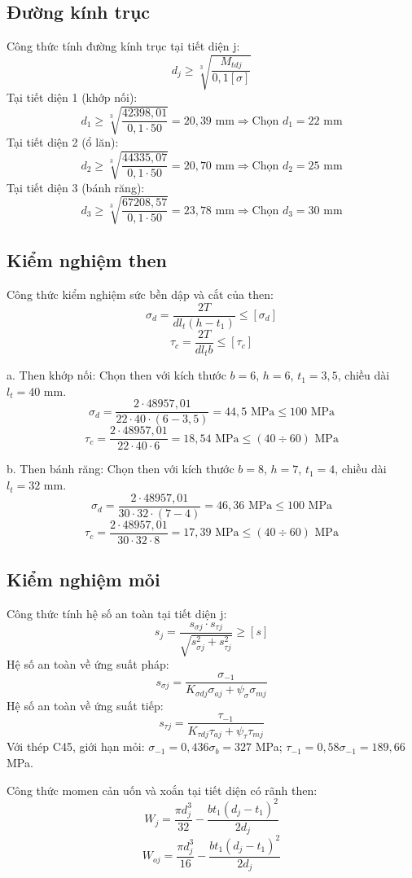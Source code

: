 \documentclass[12pt,a4paper]{report}
\begin{document}
\subsection{Đường kính trục}
Công thức tính đường kính trục tại tiết diện j:
$$d_j \geq \sqrt[3]{\frac{M_{tdj}}{0{,}1[\sigma]}}$$
Tại tiết diện 1 (khớp nối):
$$d_1 \geq \sqrt[3]{\frac{42398{,}01}{0{,}1 \cdot 50}} = 20{,}39 \text{ mm} \Rightarrow \text{Chọn } d_1 = 22 \text{ mm}$$
Tại tiết diện 2 (ổ lăn):
$$d_2 \geq \sqrt[3]{\frac{44335{,}07}{0{,}1 \cdot 50}} = 20{,}70 \text{ mm} \Rightarrow \text{Chọn } d_2 = 25 \text{ mm}$$
Tại tiết diện 3 (bánh răng):
$$d_3 \geq \sqrt[3]{\frac{67208{,}57}{0{,}1 \cdot 50}} = 23{,}78 \text{ mm} \Rightarrow \text{Chọn } d_3 = 30 \text{ mm}$$

\subsection{Kiểm nghiệm then}
Công thức kiểm nghiệm sức bền dập và cắt của then:
$$\sigma_d = \frac{2T}{dl_t(h-t_1)} \leq [\sigma_d]$$
$$\tau_c = \frac{2T}{dl_t b} \leq [\tau_c]$$

a. Then khớp nối:
Chọn then với kích thước $b=6$, $h=6$, $t_1=3{,}5$, chiều dài $l_t=40$ mm.
$$\sigma_d = \frac{2 \cdot 48957{,}01}{22 \cdot 40 \cdot (6-3{,}5)} = 44{,}5 \text{ MPa} \leq 100 \text{ MPa}$$
$$\tau_c = \frac{2 \cdot 48957{,}01}{22 \cdot 40 \cdot 6} = 18{,}54 \text{ MPa} \leq (40 \div 60) \text{ MPa}$$

b. Then bánh răng:
Chọn then với kích thước $b=8$, $h=7$, $t_1=4$, chiều dài $l_t=32$ mm.
$$\sigma_d = \frac{2 \cdot 48957{,}01}{30 \cdot 32 \cdot (7-4)} = 46{,}36 \text{ MPa} \leq 100 \text{ MPa}$$
$$\tau_c = \frac{2 \cdot 48957{,}01}{30 \cdot 32 \cdot 8} = 17{,}39 \text{ MPa} \leq (40 \div 60) \text{ MPa}$$

\subsection{Kiểm nghiệm mỏi}
Công thức tính hệ số an toàn tại tiết diện j:
$$s_j = \frac{s_{\sigma j} \cdot s_{\tau j}}{\sqrt{s_{\sigma j}^2 + s_{\tau j}^2}} \geq [s]$$
Hệ số an toàn về ứng suất pháp:
$$s_{\sigma j} = \frac{\sigma_{-1}}{K_{\sigma dj}\sigma_{aj} + \psi_\sigma \sigma_{mj}}$$
Hệ số an toàn về ứng suất tiếp:
$$s_{\tau j} = \frac{\tau_{-1}}{K_{\tau dj}\tau_{aj} + \psi_\tau \tau_{mj}}$$
Với thép C45, giới hạn mỏi: $\sigma_{-1} = 0{,}436\sigma_b = 327$ MPa; $\tau_{-1} = 0{,}58\sigma_{-1} = 189{,}66$ MPa.

Công thức momen cản uốn và xoắn tại tiết diện có rãnh then:
$$W_j = \frac{\pi d_j^3}{32} - \frac{bt_1(d_j - t_1)^2}{2d_j}$$
$$W_{oj} = \frac{\pi d_j^3}{16} - \frac{bt_1(d_j - t_1)^2}{2d_j}$$
\end{document}
